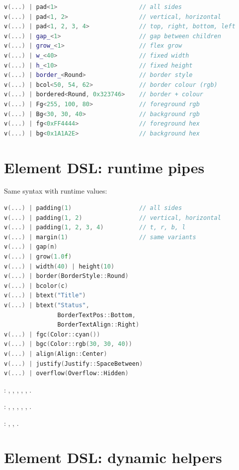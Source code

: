 \begin{lstlisting}[language=C++]
v(...) | pad<1>                       // all sides
v(...) | pad<1, 2>                    // vertical, horizontal
v(...) | pad<1, 2, 3, 4>              // top, right, bottom, left
v(...) | gap_<1>                      // gap between children
v(...) | grow_<1>                     // flex grow
v(...) | w_<40>                       // fixed width
v(...) | h_<10>                       // fixed height
v(...) | border_<Round>               // border style
v(...) | bcol<50, 54, 62>             // border colour (rgb)
v(...) | bordered<Round, 0x323746>    // border + colour
v(...) | Fg<255, 100, 80>             // foreground rgb
v(...) | Bg<30, 30, 40>               // background rgb
v(...) | fg<0xFF4444>                 // foreground hex
v(...) | bg<0x1A1A2E>                 // background hex
\end{lstlisting}

\section{Element DSL: runtime pipes}

Same syntax with runtime values:

\begin{lstlisting}[language=C++]
v(...) | padding(1)                   // all sides
v(...) | padding(1, 2)                // vertical, horizontal
v(...) | padding(1, 2, 3, 4)          // t, r, b, l
v(...) | margin(1)                    // same variants
v(...) | gap(n)
v(...) | grow(1.0f)
v(...) | width(40) | height(10)
v(...) | border(BorderStyle::Round)
v(...) | bcolor(c)
v(...) | btext("Title")
v(...) | btext("Status",
               BorderTextPos::Bottom,
               BorderTextAlign::Right)
v(...) | fgc(Color::cyan())
v(...) | bgc(Color::rgb(30, 30, 40))
v(...) | align(Align::Center)
v(...) | justify(Justify::SpaceBetween)
v(...) | overflow(Overflow::Hidden)
\end{lstlisting}

\noindent {}: , ,
, , , .

\noindent {}: , ,
, , ,
.

\noindent {}: , ,
.

\section{Element DSL: dynamic helpers}

